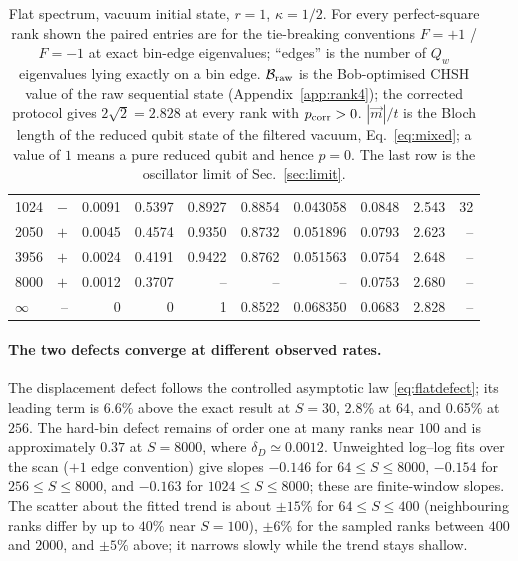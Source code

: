 \documentclass[11pt,a4paper]{article}
\begin{document}
\begin{table}[t]
\begin{tabular}{lrrrrrrrrr}
1024 & $-$ & 0.0091 & 0.5397 & 0.8927 & 0.8854 & 0.043058 & 0.0848 & 2.543 & 32\\
2050 & $+$ & 0.0045 & 0.4574 & 0.9350 & 0.8732 & 0.051896 & 0.0793 & 2.623 & --\\
3956 & $+$ & 0.0024 & 0.4191 & 0.9422 & 0.8762 & 0.051563 & 0.0754 & 2.648 & --\\
8000 & $+$ & 0.0012 & 0.3707 & -- & -- & -- & 0.0753 & 2.680 & --\\
$\infty$ & -- & 0 & 0 & 1 & 0.8522 & 0.068350 & 0.0683 & 2.828 & --\\
\bottomrule
\end{tabular}
\caption{Flat spectrum, vacuum initial state, $r=1$, $\kappa=1/2$. For every perfect-square rank shown the paired entries are for the tie-breaking conventions $F=+1$ / $F=-1$ at exact bin-edge eigenvalues; ``edges'' is the number of $Q_w$ eigenvalues lying exactly on a bin edge. $\mathcal B_{\rm raw}$ is the Bob-optimised CHSH value of the raw sequential state (Appendix~\ref{app:rank4}); the corrected protocol gives $2\sqrt2=2.828$ at every rank with $p_{\rm corr}>0$. $|\vec m|/t$ is the Bloch length of the reduced qubit state of the filtered vacuum, Eq.~\eqref{eq:mixed}; a value of $1$ means a pure reduced qubit and hence $p=0$. The last row is the oscillator limit of Sec.~\ref{sec:limit}.}
\label{tab:scan}
\end{table}

\paragraph{The two defects converge at different observed rates.}
The displacement defect follows the controlled asymptotic law \eqref{eq:flatdefect}; its leading term is 6.6\% above the exact result at $S=30$, 2.8\% at $64$, and 0.65\% at $256$. The hard-bin defect remains of order one at many ranks near $100$ and is approximately $0.37$ at $S=8000$, where $\delta_D\simeq0.0012$. Unweighted log--log fits over the scan ($+1$ edge convention) give slopes $-0.146$ for $64\le S\le8000$, $-0.154$ for $256\le S\le8000$, and $-0.163$ for $1024\le S\le8000$; these are finite-window slopes. The scatter about the fitted trend is about $\pm15\%$ for $64\le S\le400$ (neighbouring ranks differ by up to $40\%$ near $S=100$), $\pm6\%$ for the sampled ranks between $400$ and $2000$, and $\pm5\%$ above; it narrows slowly while the trend stays shallow.
\end{document}
